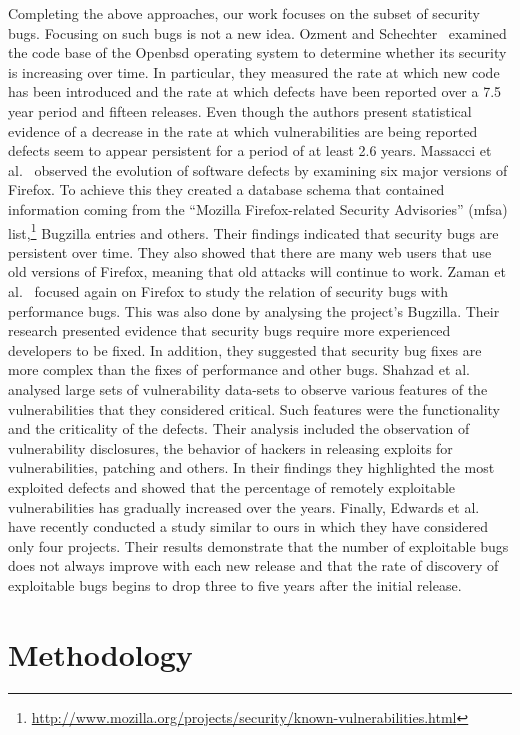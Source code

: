 \documentclass{sig-alternate}
\begin{document}
Completing the above approaches, our work focuses on the subset of security bugs.
Focusing on such bugs is not a new idea.
Ozment and Schechter~\cite{OS06} examined the code base of the Open{\sc bsd}
operating system to determine whether its security is increasing
over time. In particular, they measured the rate at which new code
has been introduced and the rate at which defects have been reported over
a 7.5 year period and fifteen releases.
Even though the authors present statistical evidence
of a decrease in the rate at which vulnerabilities are being reported
defects seem to appear persistent for a period of at least 2.6 years.
Massacci et al.~\cite{MNN11} observed
the evolution of software defects by examining six major versions of Firefox.
To achieve this they created a database schema that contained information
coming from the ``Mozilla Firefox-related Security Advisories'' ({\sc mfsa})
list,\footnote{\url{http://www.mozilla.org/projects/security/known-vulnerabilities.html}}
Bugzilla entries and others. Their findings indicated that security bugs are
persistent over time. They also showed that there are many web users that use
old versions of Firefox, meaning that old attacks will continue to work.
Zaman et al.~\cite{ZAH11} focused again on Firefox to study the relation of
security bugs with performance bugs. This was also done by analysing the project's
Bugzilla. Their research presented evidence that security bugs require more experienced developers
to be fixed. In addition, they suggested that security bug fixes are more complex than the
fixes of performance and other bugs.
Shahzad et al.~\cite{SSL12} analysed large sets of vulnerability data-sets to observe
various features of the vulnerabilities that they considered critical. Such features
were the functionality and the criticality of the defects. Their analysis
included the observation of vulnerability disclosures, the behavior of
hackers in releasing exploits for vulnerabilities, patching and others. In
their findings they highlighted the most exploited defects and showed that
the percentage of remotely exploitable vulnerabilities has gradually increased
over the years. Finally, Edwards et al.~\cite{EC12} have recently conducted
a study similar  to ours in which they have considered only four projects.
Their results demonstrate that the number of exploitable bugs does not
always improve with each new release and that the rate of discovery of
exploitable bugs begins to drop three to five years after the
initial release.

\section{Methodology}
\label{sec:meth}
\end{document}
